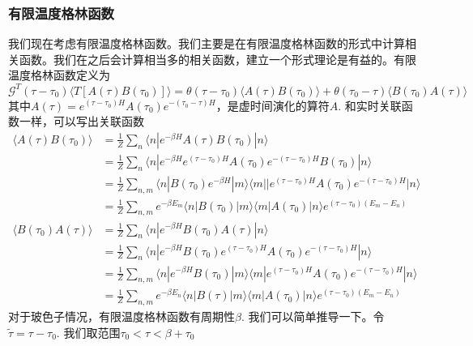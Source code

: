 \documentclass{article}
\numberwithin{equation}{subsection}
\begin{document}
\subsubsection{有限温度格林函数}
我们现在考虑有限温度格林函数。我们主要是在有限温度格林函数的形式中计算相关函数。我们在之后会计算相当多的相关函数，建立一个形式理论是有益的。有限温度格林函数定义为
\begin{equation}
    \mathcal{G}^T(\tau-\tau_0)\langle T[A(\tau)B(\tau_0)]\rangle=\theta(\tau-\tau_0)\langle A(\tau)B(\tau_0)\rangle+\theta(\tau_0-\tau)\langle B(\tau_0)A(\tau)\rangle
\end{equation}
其中$A(\tau)=e^{(\tau-\tau_0)H}A(\tau_0)e^{-(\tau_0-\tau)H}$，是虚时间演化的算符$A$. 和实时关联函数一样，可以写出关联函数
\begin{equation}
    \begin{split}
        \langle A(\tau)B(\tau_0)\rangle&=\frac{1}{Z}\sum_{n}\langle n|e^{-\beta H}A(\tau)B(\tau_0)|n\rangle\\
        &=\frac{1}{Z}\sum_n\langle n|e^{-\beta H}e^{(\tau-\tau_0)H}A(\tau_0)e^{-(\tau-\tau_0)H}B(\tau_0)|n\rangle\\
        &=\frac{1}{Z}\sum_{n,m}\langle n|B(\tau_0)e^{-\beta H}|m\rangle\langle m||e^{(\tau-\tau_0)H}A(\tau_0)e^{-(\tau-\tau_0)H}|n\rangle\\
        &=\frac{1}{Z}\sum_{n,m}e^{-\beta E_m}\langle n|B(\tau_0)|m\rangle\langle m|A(\tau_0)|n\rangle e^{(\tau-\tau_0)(E_m-E_n)}
    \end{split}
\end{equation}
\begin{equation}
    \begin{split}
        \langle B(\tau_0)A(\tau)\rangle&=\frac{1}{Z}\sum_n\langle n|e^{-\beta H}B(\tau_0)A(\tau)|n\rangle\\
        &=\frac{1}{Z}\sum_n\langle n|e^{-\beta H}B(\tau_0)e^{(\tau-\tau_0)H}A(\tau_0)e^{-(\tau-\tau_0)H}|n\rangle\\
        &=\frac{1}{Z}\sum_{n,m}\langle n|e^{-\beta H}B(\tau_0)|m\rangle\langle m|e^{(\tau-\tau_0)H}A(\tau_0)e^{-(\tau-\tau_0)H}|n\rangle\\
        &=\frac{1}{Z}\sum_{n,m}e^{-\beta E_n}\langle n|B(\tau)|m\rangle\langle m|A(\tau_0)|n\rangle e^{(\tau-\tau_0)(E_m-E_n)}
    \end{split}
\end{equation}
对于玻色子情况，有限温度格林函数有周期性$\beta$. 我们可以简单推导一下。令$\tilde{\tau}=\tau-\tau_0$. 我们取范围$\tau_0<\tau<\beta+\tau_0$
\begin{center}
\end{center}
\end{document}
